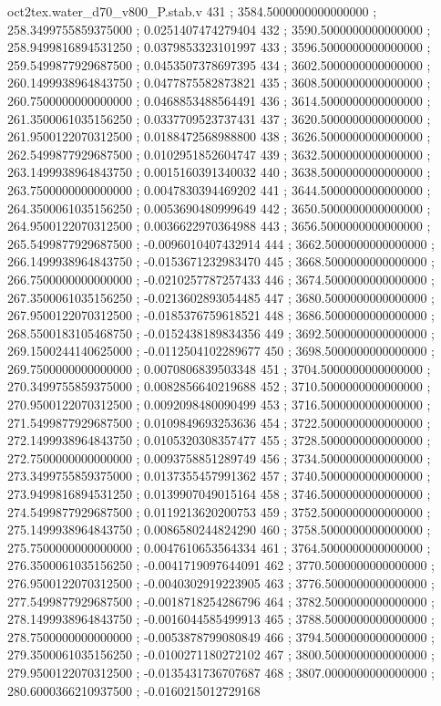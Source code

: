 \begin{filecontents}[overwrite]{oct2tex.water_d70_v800_P.stab.v}
431 ; 3584.5000000000000000 ; 258.3499755859375000 ; 0.0251407474279404
432 ; 3590.5000000000000000 ; 258.9499816894531250 ; 0.0379853323101997
433 ; 3596.5000000000000000 ; 259.5499877929687500 ; 0.0453507378697395
434 ; 3602.5000000000000000 ; 260.1499938964843750 ; 0.0477875582873821
435 ; 3608.5000000000000000 ; 260.7500000000000000 ; 0.0468853488564491
436 ; 3614.5000000000000000 ; 261.3500061035156250 ; 0.0337709523737431
437 ; 3620.5000000000000000 ; 261.9500122070312500 ; 0.0188472568988800
438 ; 3626.5000000000000000 ; 262.5499877929687500 ; 0.0102951852604747
439 ; 3632.5000000000000000 ; 263.1499938964843750 ; 0.0015160391340032
440 ; 3638.5000000000000000 ; 263.7500000000000000 ; 0.0047830394469202
441 ; 3644.5000000000000000 ; 264.3500061035156250 ; 0.0053690480999649
442 ; 3650.5000000000000000 ; 264.9500122070312500 ; 0.0036622970364988
443 ; 3656.5000000000000000 ; 265.5499877929687500 ; -0.0096010407432914
444 ; 3662.5000000000000000 ; 266.1499938964843750 ; -0.0153671232983470
445 ; 3668.5000000000000000 ; 266.7500000000000000 ; -0.0210257787257433
446 ; 3674.5000000000000000 ; 267.3500061035156250 ; -0.0213602893054485
447 ; 3680.5000000000000000 ; 267.9500122070312500 ; -0.0185376759618521
448 ; 3686.5000000000000000 ; 268.5500183105468750 ; -0.0152438189834356
449 ; 3692.5000000000000000 ; 269.1500244140625000 ; -0.0112504102289677
450 ; 3698.5000000000000000 ; 269.7500000000000000 ; 0.0070806839503348
451 ; 3704.5000000000000000 ; 270.3499755859375000 ; 0.0082856640219688
452 ; 3710.5000000000000000 ; 270.9500122070312500 ; 0.0092098480090499
453 ; 3716.5000000000000000 ; 271.5499877929687500 ; 0.0109849693253636
454 ; 3722.5000000000000000 ; 272.1499938964843750 ; 0.0105320308357477
455 ; 3728.5000000000000000 ; 272.7500000000000000 ; 0.0093758851289749
456 ; 3734.5000000000000000 ; 273.3499755859375000 ; 0.0137355457991362
457 ; 3740.5000000000000000 ; 273.9499816894531250 ; 0.0139907049015164
458 ; 3746.5000000000000000 ; 274.5499877929687500 ; 0.0119213620200753
459 ; 3752.5000000000000000 ; 275.1499938964843750 ; 0.0086580244824290
460 ; 3758.5000000000000000 ; 275.7500000000000000 ; 0.0047610653564334
461 ; 3764.5000000000000000 ; 276.3500061035156250 ; -0.0041719097644091
462 ; 3770.5000000000000000 ; 276.9500122070312500 ; -0.0040302919223905
463 ; 3776.5000000000000000 ; 277.5499877929687500 ; -0.0018718254286796
464 ; 3782.5000000000000000 ; 278.1499938964843750 ; -0.0016044585499913
465 ; 3788.5000000000000000 ; 278.7500000000000000 ; -0.0053878799080849
466 ; 3794.5000000000000000 ; 279.3500061035156250 ; -0.0100271180272102
467 ; 3800.5000000000000000 ; 279.9500122070312500 ; -0.0135431736707687
468 ; 3807.0000000000000000 ; 280.6000366210937500 ; -0.0160215012729168
\end{filecontents}
